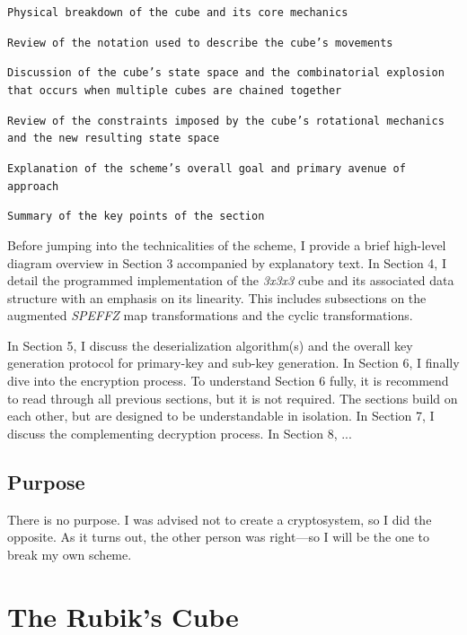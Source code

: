 \documentclass[12pt]{article}
\begin{document}
\begin{verbenumerate}
    \item \texttt{Physical breakdown of the cube and its core mechanics}
    \item \texttt{Review of the notation used to describe the cube's movements}
    \item \texttt{Discussion of the cube's state space and the combinatorial explosion that occurs when multiple cubes are chained together}
    \item \texttt{Review of the constraints imposed by the cube's rotational mechanics and the new resulting state space}
    \item \texttt{Explanation of the scheme's overall goal and primary avenue of approach}
    \item \texttt{Summary of the key points of the section}
\end{verbenumerate}

Before jumping into the technicalities of the scheme, I provide a brief high-level diagram overview in Section 3 accompanied by explanatory text. In Section 4, I detail the programmed implementation of the \textit{3x3x3} cube and its associated data structure with an emphasis on its linearity. This includes subsections on the augmented \textit{SPEFFZ} map transformations and the cyclic transformations. 

In Section 5, I discuss the deserialization algorithm(s) and the overall key generation protocol for primary-key and sub-key generation. In Section 6, I finally dive into the encryption process. To understand Section 6 fully, it is recommend to read through all previous sections, but it is not required. The sections build on each other, but are designed to be understandable in isolation. In Section 7, I discuss the complementing decryption process. In Section 8, ...

\subsection{Purpose}
There is no purpose. I was advised not to create a cryptosystem, so I did the opposite. As it turns out, the other person was right—so I will be the one to break my own scheme.

\newpage

\section{The Rubik's Cube}
\end{document}
